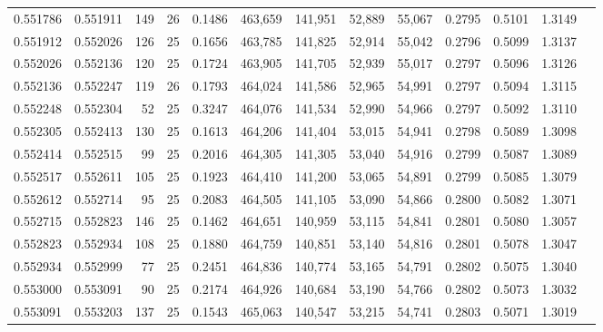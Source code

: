 \begin{tabular}{rrrrrrrrrrrrr}
0.551786 & 0.551911 &   149 &  26 &                                     0.1486 & 463,659 & 141,951 &  52,889 &  55,067 & 0.2795 & 0.5101 & 1.3149 \\
0.551912 & 0.552026 &   126 &  25 &                                     0.1656 & 463,785 & 141,825 &  52,914 &  55,042 & 0.2796 & 0.5099 & 1.3137 \\
0.552026 & 0.552136 &   120 &  25 &                                     0.1724 & 463,905 & 141,705 &  52,939 &  55,017 & 0.2797 & 0.5096 & 1.3126 \\
0.552136 & 0.552247 &   119 &  26 &                                     0.1793 & 464,024 & 141,586 &  52,965 &  54,991 & 0.2797 & 0.5094 & 1.3115 \\
0.552248 & 0.552304 &    52 &  25 &                                     0.3247 & 464,076 & 141,534 &  52,990 &  54,966 & 0.2797 & 0.5092 & 1.3110 \\
0.552305 & 0.552413 &   130 &  25 &                                     0.1613 & 464,206 & 141,404 &  53,015 &  54,941 & 0.2798 & 0.5089 & 1.3098 \\
0.552414 & 0.552515 &    99 &  25 &                                     0.2016 & 464,305 & 141,305 &  53,040 &  54,916 & 0.2799 & 0.5087 & 1.3089 \\
0.552517 & 0.552611 &   105 &  25 &                                     0.1923 & 464,410 & 141,200 &  53,065 &  54,891 & 0.2799 & 0.5085 & 1.3079 \\
0.552612 & 0.552714 &    95 &  25 &                                     0.2083 & 464,505 & 141,105 &  53,090 &  54,866 & 0.2800 & 0.5082 & 1.3071 \\
0.552715 & 0.552823 &   146 &  25 &                                     0.1462 & 464,651 & 140,959 &  53,115 &  54,841 & 0.2801 & 0.5080 & 1.3057 \\
0.552823 & 0.552934 &   108 &  25 &                                     0.1880 & 464,759 & 140,851 &  53,140 &  54,816 & 0.2801 & 0.5078 & 1.3047 \\
0.552934 & 0.552999 &    77 &  25 &                                     0.2451 & 464,836 & 140,774 &  53,165 &  54,791 & 0.2802 & 0.5075 & 1.3040 \\
0.553000 & 0.553091 &    90 &  25 &                                     0.2174 & 464,926 & 140,684 &  53,190 &  54,766 & 0.2802 & 0.5073 & 1.3032 \\
0.553091 & 0.553203 &   137 &  25 &                                     0.1543 & 465,063 & 140,547 &  53,215 &  54,741 & 0.2803 & 0.5071 & 1.3019 \\

\end{tabular}
